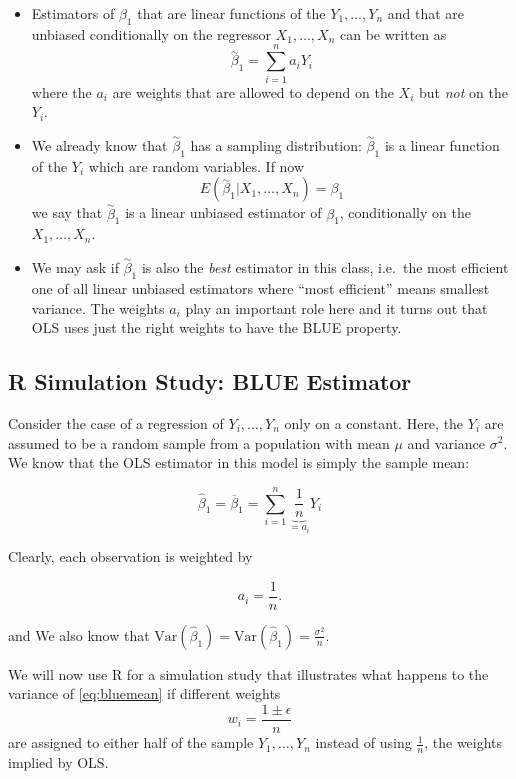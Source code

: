 \documentclass[]{book}
\theoremstyle{definition}
\theoremstyle{definition}
\theoremstyle{definition}
\theoremstyle{remark}
\begin{document}
\begin{itemize}
\item
  Estimators of \(\beta_1\) that are linear functions of the
  \(Y_1, \dots, Y_n\) and that are unbiased conditionally on the
  regressor \(X_1, \dots, X_n\) can be written as
  \[ \overset{\sim}{\beta}_1 = \sum_{i=1}^n a_i Y_i \] where the \(a_i\)
  are weights that are allowed to depend on the \(X_i\) but \emph{not}
  on the \(Y_i\).
\item
  We already know that \(\overset{\sim}{\beta}_1\) has a sampling
  distribution: \(\overset{\sim}{\beta}_1\) is a linear function of the
  \(Y_i\) which are random variables. If now
  \[ E(\overset{\sim}{\beta}_1 | X_1, \dots, X_n) = \beta_1 \] we say
  that \(\overset{\sim}{\beta}_1\) is a linear unbiased estimator of
  \(\beta_1\), conditionally on the \(X_1, \dots, X_n\).
\item
  We may ask if \(\overset{\sim}{\beta}_1\) is also the \emph{best}
  estimator in this class, i.e.~the most efficient one of all linear
  unbiased estimators where ``most efficient'' means smallest variance.
  The weights \(a_i\) play an important role here and it turns out that
  OLS uses just the right weights to have the BLUE property.
\end{itemize}

\subsection*{R Simulation Study: BLUE
Estimator}\label{r-simulation-study-blue-estimator}

Consider the case of a regression of \(Y_i,\dots,Y_n\) only on a
constant. Here, the \(Y_i\) are assumed to be a random sample from a
population with mean \(\mu\) and variance \(\sigma^2\). We know that the
OLS estimator in this model is simply the sample mean:

\begin{equation}
\hat{\beta}_1 = \overline{\beta}_1 = \sum_{i=1}^n \underbrace{\frac{1}{n}}_{=a_i} Y_i \label{eq:bluemean}
\end{equation}

Clearly, each observation is weighted by

\[a_i = \frac{1}{n}.\]

and We also know that
\(\text{Var}(\hat{\beta}_1)=\text{Var}(\hat\beta_1)=\frac{\sigma^2}{n}\).

We will now use R for a simulation study that illustrates what happens
to the variance of \eqref{eq:bluemean} if different weights
\[ w_i = \frac{1 \pm \epsilon}{n} \] are assigned to either half of the
sample \(Y_1, \dots, Y_n\) instead of using \(\frac{1}{n}\), the weights
implied by OLS.
\end{document}
